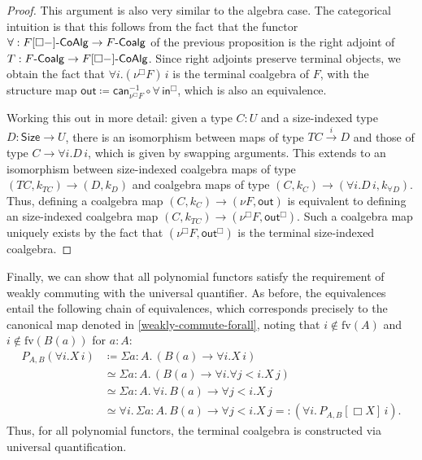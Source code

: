 \documentclass[10pt,a4paper]{article}
\theoremstyle{definition}
\theoremstyle{remark}
\renewcommand{\.}{.\,} %
\renewcommand{\:}{:} %
\newcommand{\Size}{\mathsf{Size}}
\newcommand{\F}{F}
\newcommand{\FCoalg}{F\text-\sf{Coalg}}
\newcommand{\sFCoalg}{F[\Box{-}]\text-\sf{CoAlg}}
\newcommand{\In}{\mathsf{in}}
\newcommand{\out}{\mathsf{out}}
\newcommand{\sto}{\overset{i}{\to}}
\newcommand{\0}{\mathbf{0}}
\newcommand{\1}{\mathbf{1}}
\newcommand\<\langle
\renewcommand\>\rangle
\renewcommand\sf\mathsf
\theoremstyle{remark}
\begin{document}
\begin{proof}
This argument is also very similar to the algebra case.
The categorical intuition is that this follows from the fact that the functor $\forall : \sFCoalg \to \FCoalg$ of the previous proposition is the right adjoint of $T : \FCoalg \to \sFCoalg$.
Since right adjoints preserve terminal objects, we obtain the fact that $\forall i. (\nu^\Box F) \, i$ is the terminal coalgebra of $F$, with the structure map $\out \coloneq  \mathsf{can}^{-1}_{\nu^\Box F} \circ \forall \, \In^\Box$, which is also an equivalence.

Working this out in more detail: given a type $C : U$ and a size-indexed type $D : \Size \to U$, there is an isomorphism between maps of type $TC \sto D$ and those of type $C \to \forall i . D \, i $, which is given by swapping arguments. This extends to an isomorphism between size-indexed coalgebra maps of type $(TC, k_{TC}) \to (D, k_{D})$ and coalgebra maps of type $(C, k_C) \to (\forall i . D \, i, k_{\forall D})$. Thus, defining a coalgebra map $(C, k_C) \to (\nu \F, \out) $ is equivalent to defining an size-indexed coalgebra map $(C, k_{TC}) \to (\nu^\Box F, \out^\Box)$. Such a coalgebra map uniquely exists by the fact that $(\nu^\Box F, \out^\Box)$ is the terminal size-indexed coalgebra.  
\end{proof}

Finally, we can show that all polynomial functors satisfy the requirement of weakly commuting with the universal quantifier. As before, the equivalences entail the following chain of equivalences, which corresponds precisely to the canonical map denoted in \autoref{weakly-commute-forall}, noting that $i \notin \text{fv}(A)$ and $i \notin \text{fv}(B(a))$ for $a : A$:
\begin{align*}
    P_{A,B} (\forall i .X \, i) &\coloneq  \Sigma {a : A} \. (B (a) \to \forall i .X \, i) \\
    &\simeq \Sigma {a : A} \. (B (a) \to \forall i . \forall j < i . X \, j) \\
    &\simeq \Sigma {a : A} \. \forall i \. B(a) \to \forall j < i . X \, j \\
    &\simeq \forall i \. \Sigma {a : A} \. B(a) \to \forall j < i . X \, j
    =: (\forall i \. P_{A,B} [\Box X] \, i).
\end{align*}
Thus, for all polynomial functors, the terminal coalgebra is constructed via universal quantification.
\end{document}
